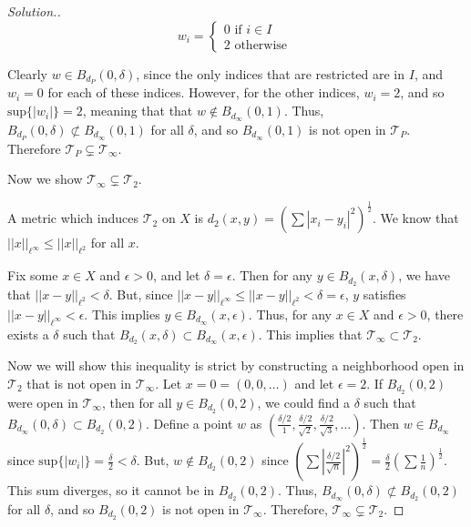 \documentclass{article}
\newcommand{\T}{\mathcal{T}}
\newcommand{\sk}{\smallskip}
\begin{document}
\begin{enumerate}
\begin{proof}[Solution.]
    $$w_i = \begin{cases}
        0 \text{ if } i \in I \\
        2 \text{ otherwise }
    \end{cases}$$

    Clearly $w \in B_{d_P}(0, \delta)$, since the only indices that are restricted are in $I$, and $w_i = 0$ for each of these indices. However, for the other indices, $w_i = 2$, and so $\text{sup}\{|w_i|\} = 2$, meaning that that $w \notin B_{d_\infty}(0, 1)$. Thus, $B_{d_P}(0, \delta) \not\subset B_{d_\infty}(0, 1)$ for all $\delta$, and so $B_{d_\infty}(0, 1)$ is not open in $\T_P$. Therefore $\T_P \subsetneq \T_\infty$.

    \sk

    Now we show $\T_\infty \subsetneq \T_2$.

    \sk

    A metric which induces $\T_2$ on $X$ is $d_2(x, y) = \left(\sum |x_i - y_i|^2 \right)^\frac{1}{2}$. We know that $||x||_{\ell^\infty} \leq ||x||_{\ell^2}$ for all $x$. 

    \sk

    Fix some $x \in X$ and $\epsilon > 0$, and let $\delta = \epsilon$. Then for any $y \in B_{d_2}(x, \delta)$, we have that $||x - y||_{\ell^2} < \delta$. But, since $||x-y||_{\ell^\infty} \leq ||x - y||_{\ell^2} < \delta = \epsilon$, $y$ satisfies $||x-y||_{\ell^\infty} < \epsilon$. This implies $y \in B_{d_\infty}(x, \epsilon)$. Thus, for any $x \in X$ and $\epsilon > 0$, there exists a $\delta$ such that $B_{d_2}(x, \delta) \subset B_{d_\infty}(x, \epsilon)$. This implies that $\T_\infty \subset \T_2$. 

    \sk

    Now we will show this inequality is strict by constructing a neighborhood open in $\T_2$ that is not open in $\T_\infty$. Let $x = 0 = (0, 0, \dots)$ and let $\epsilon = 2$. If $B_{d_2}(0, 2)$ were open in $\T_\infty$, then for all $y \in B_{d_2}(0, 2)$, we could find a $\delta$ such that $B_{d_\infty}(0, \delta) \subset B_{d_2}(0, 2)$. Define a point $w$ as $\left(\frac{\delta/2}{1}, \frac{\delta/2}{\sqrt{2}}, \frac{\delta/2}{\sqrt{3}}, \dots \right)$. Then $w \in B_{d_\infty}$ since $\text{sup}\{|w_i|\} = \frac{\delta}{2} < \delta$. But, $w \notin B_{d_2}(0, 2)$ since $\left(\sum \left|\frac{\delta/2}{\sqrt{n}}\right|^2\right)^\frac{1}{2} = \frac{\delta}{2}\left(\sum \frac{1}{n}\right)^\frac{1}{2}$. This sum diverges, so it cannot be in $B_{d_2}(0, 2)$. Thus, $B_{d_\infty}(0, \delta) \not\subset B_{d_2}(0, 2)$ for all $\delta$, and so $B_{d_2}(0, 2)$ is not open in $\T_\infty$. Therefore, $\T_\infty \subsetneq \T_2$. 


\end{proof}
\end{enumerate}
\end{document}
